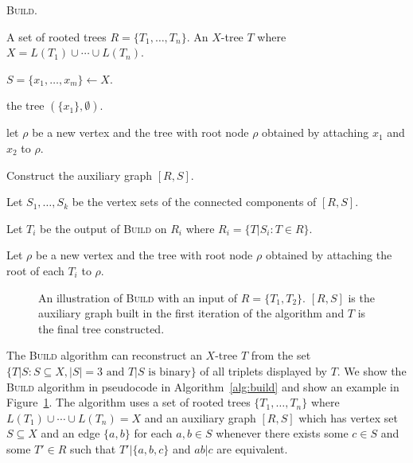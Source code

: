 \begin{algorithm}[h]
  \caption{\textsc{Build}.}
  \label{alg:build}

  \begin{algorithmic}
    \Require A set of rooted trees $R = \{T_1,\dotsc,T_n\}$.
    \Ensure  An $X$-tree $T$ where $X = L(T_1) \cup \dotsb \cup L(T_n)$.

    \State $S = \{x_1,\dotsc,x_m\} \gets X$.

     \Return the tree $(\{x_1\},\emptyset)$. \EndIf

     let $\rho$ be a new vertex and \Return the tree with root
    node $\rho$ obtained by attaching $x_1$ and $x_2$ to $\rho$. \EndIf

    \State Construct the auxiliary graph $[R,S]$.

    \State Let $S_1,\dotsc,S_k$ be the vertex sets of the connected components
    of $[R,S]$.

    \State Let $T_i$ be the output of \textsc{Build} on $R_i$ where $R_i =
    \{T|S_i \colon T \in R\}$.
    \EndFor

    \State Let $\rho$ be a new vertex and \Return the tree with root node
    $\rho$ obtained by attaching the root of each $T_i$ to $\rho$.
    
  \end{algorithmic}
\end{algorithm}

\begin{figure}
  \centering
  
  \caption{An illustration of \textsc{Build} with an input of $R =
    \{T_1,T_2\}$.  $[R,S]$ is the auxiliary graph built in the first iteration
    of the algorithm and $T$ is the final tree constructed.}
  \label{fig:build-ex}
\end{figure}

The \textsc{Build} algorithm \cite{aho1981inferring} can reconstruct an
$X$-tree $T$ from the set $\{T|S \colon S \subseteq X, |S| = 3 \text{ and }
T|S \text{ is binary}\}$ of all triplets displayed by $T$.  We show the
\textsc{Build} algorithm in pseudocode in Algorithm~\ref{alg:build} and show
an example in Figure~\ref{fig:build-ex}.  The algorithm uses a set of rooted
trees $\{T_1,\dotsc,T_n\}$ where $L(T_1) \cup \dotsb \cup L(T_n) = X$ and an
auxiliary graph $[R,S]$ which has vertex set $S \subseteq X$ and an edge
$\{a,b\}$ for each $a,b \in S$ whenever there exists some $c \in S$ and some
$T' \in R$ such that $T'|\{a,b,c\}$ and $ab|c$ are equivalent.

